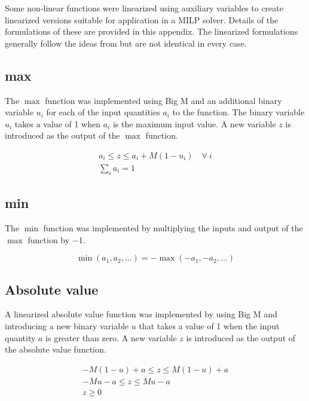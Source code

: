 \label{sec:linearization}
\renewcommand{\theequation}{A.\arabic{equation}}

Some non-linear functions were linearized using auxiliary variables to create linearized versions suitable for application in a MILP solver. Details of the formulations of these are provided in this appendix.
The linearized formulations generally follow the ideas from \cite{YALPMIP_logic} but are not identical in every case.

\subsection{max}

The $\max$ function was implemented using Big M and an additional binary variable $u_i$ for each of the input quantities $a_i$ to the function. The binary variable $u_i$ takes a value of \num{1} when $a_i$ is the maximum input value. A new variable $z$ is introduced as the output of the $\max$ function.

\begin{gather}
a_i \le z \le a_i + M (1 - u_i) \quad \forall \ i
\\
\sum_i a_i = 1
\end{gather}

\subsection{min}

The $\min$ function was implemented by multiplying the inputs and output of the $\max$ function by \num{-1}.

\begin{equation}
\min\left(a_1, a_2, ...\right) = -\max\left(-a_1, -a_2, ...\right)
\end{equation}

\subsection{Absolute value}

A linearized absolute value function was implemented by using Big M and introducing a new binary variable $u$ that takes a value of \num{1} when the input quantity $a$ is greater than zero. A new variable $z$ is introduced as the output of the absolute value function.

\begin{gather}
-M (1 - u) + a \le z \le M (1 - u) + a
\\
-M u - a \le z \le M u - a
\\
z \ge 0
\end{gather}

